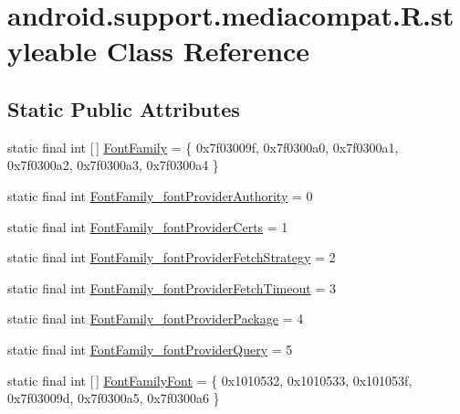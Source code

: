 \hypertarget{classandroid_1_1support_1_1mediacompat_1_1_r_1_1styleable}{}\section{android.\+support.\+mediacompat.\+R.\+styleable Class Reference}
\label{classandroid_1_1support_1_1mediacompat_1_1_r_1_1styleable}
\subsection*{Static Public Attributes}
\begin{DoxyCompactItemize}
\item 
static final int \mbox{[}$\,$\mbox{]} \mbox{\hyperlink{classandroid_1_1support_1_1mediacompat_1_1_r_1_1styleable_a52c18faf466a6047f0ef99ff06f24d11}{Font\+Family}} = \{ 0x7f03009f, 0x7f0300a0, 0x7f0300a1, 0x7f0300a2, 0x7f0300a3, 0x7f0300a4 \}
\item 
static final int \mbox{\hyperlink{classandroid_1_1support_1_1mediacompat_1_1_r_1_1styleable_a4235e49291443797bfb83152ca627c3d}{Font\+Family\+\_\+font\+Provider\+Authority}} = 0
\item 
static final int \mbox{\hyperlink{classandroid_1_1support_1_1mediacompat_1_1_r_1_1styleable_ab703e2fe634559f11af5e65a675bc409}{Font\+Family\+\_\+font\+Provider\+Certs}} = 1
\item 
static final int \mbox{\hyperlink{classandroid_1_1support_1_1mediacompat_1_1_r_1_1styleable_aa140fce064e6d67d3de2ab90d5d0bdd2}{Font\+Family\+\_\+font\+Provider\+Fetch\+Strategy}} = 2
\item 
static final int \mbox{\hyperlink{classandroid_1_1support_1_1mediacompat_1_1_r_1_1styleable_ae2122ae301debf7c5ba1ae8ad75ac1a7}{Font\+Family\+\_\+font\+Provider\+Fetch\+Timeout}} = 3
\item 
static final int \mbox{\hyperlink{classandroid_1_1support_1_1mediacompat_1_1_r_1_1styleable_a091f90561a26b591650c7a0068dc94ca}{Font\+Family\+\_\+font\+Provider\+Package}} = 4
\item 
static final int \mbox{\hyperlink{classandroid_1_1support_1_1mediacompat_1_1_r_1_1styleable_aba9468cea16882d62306ce2ab1c3abc4}{Font\+Family\+\_\+font\+Provider\+Query}} = 5
\item 
static final int \mbox{[}$\,$\mbox{]} \mbox{\hyperlink{classandroid_1_1support_1_1mediacompat_1_1_r_1_1styleable_ab335f4196bd2d829025326ff3efbcda2}{Font\+Family\+Font}} = \{ 0x1010532, 0x1010533, 0x101053f, 0x7f03009d, 0x7f0300a5, 0x7f0300a6 \}

\end{DoxyCompactItemize}
